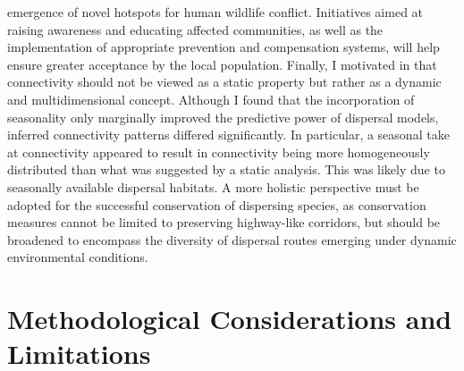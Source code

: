 \documentclass[../FinalThesis.tex]{subfiles}
\begin{document}
emergence of novel hotspots for human wildlife conflict. Initiatives aimed at
raising awareness and educating affected communities, as well as the
implementation of appropriate prevention and compensation systems, will help
ensure greater acceptance by the local population. Finally, I motivated in
 that connectivity should not be viewed as a static
property but rather as a dynamic and multidimensional concept. Although I found
that the incorporation of seasonality only marginally improved the predictive
power of dispersal models, inferred connectivity patterns differed
significantly. In particular, a seasonal take at connectivity appeared to result
in connectivity being more homogeneously distributed than what was suggested by
a static analysis. This was likely due to seasonally available dispersal
habitats. A more holistic perspective must be adopted for the successful
conservation of dispersing species, as conservation measures cannot be limited
to preserving highway-like corridors, but should be broadened to encompass the
diversity of dispersal routes emerging under dynamic environmental conditions.

\section{Methodological Considerations and Limitations}
\end{document}
